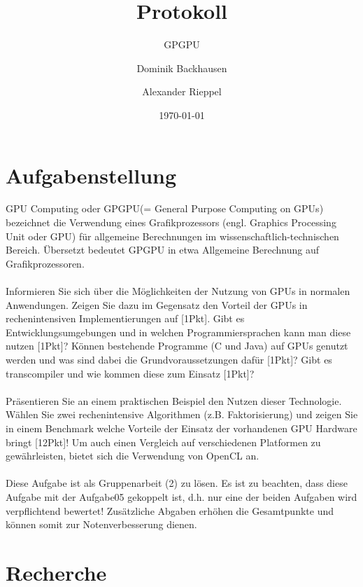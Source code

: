 \documentclass[a4paper,12pt]{scrreprt}
\begin{document}
\author{Dominik Backhausen \and Alexander Rieppel} %
\title{Protokoll} %
\subject{VSDB} %
\subtitle{GPGPU} %
\date{\today} %
\publishers{5AHITT} %

\maketitle
\tableofcontents


\chapter{Aufgabenstellung}
	GPU Computing oder GPGPU(= General Purpose Computing on GPUs) bezeichnet die Verwendung eines Grafikprozessors (engl. Graphics Processing Unit oder GPU) für allgemeine Berechnungen im wissenschaftlich-technischen Bereich. Übersetzt bedeutet GPGPU in etwa Allgemeine Berechnung auf Grafikprozessoren.\\\\
	
	Informieren Sie sich über die Möglichkeiten der Nutzung von GPUs in normalen Anwendungen. Zeigen Sie dazu im Gegensatz den Vorteil der GPUs in rechenintensiven Implementierungen auf [1Pkt]. Gibt es Entwicklungsumgebungen und in welchen Programmiersprachen kann man diese nutzen [1Pkt]? Können bestehende Programme (C und Java) auf GPUs genutzt werden und was sind dabei die Grundvoraussetzungen dafür [1Pkt]? Gibt es transcompiler und wie kommen diese zum Einsatz [1Pkt]?\\\\
	
	Präsentieren Sie an einem praktischen Beispiel den Nutzen dieser Technologie. Wählen Sie zwei rechenintensive Algorithmen (z.B. Faktorisierung) und zeigen Sie in einem Benchmark welche Vorteile der Einsatz der vorhandenen GPU Hardware bringt [12Pkt]! Um auch einen Vergleich auf verschiedenen Platformen zu gewährleisten, bietet sich die Verwendung von OpenCL an.\\\\
	
	Diese Aufgabe ist als Gruppenarbeit (2) zu lösen. Es ist zu beachten, dass diese Aufgabe mit der Aufgabe05 gekoppelt ist, d.h. nur eine der beiden Aufgaben wird verpflichtend bewertet! Zusätzliche Abgaben erhöhen die Gesamtpunkte und können somit zur Notenverbesserung dienen.
\chapter{Recherche}
\end{document}
